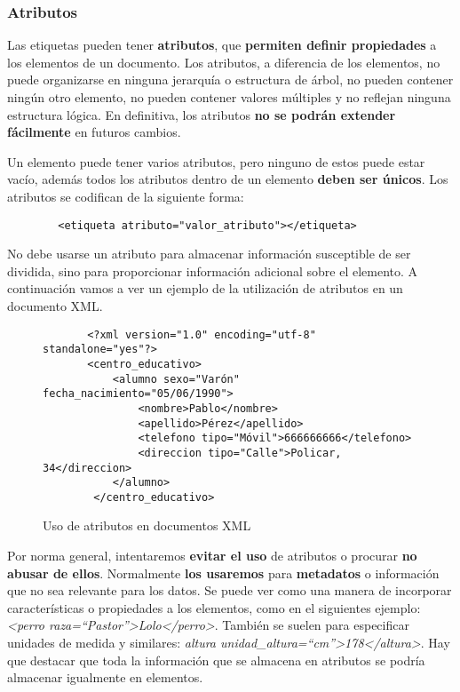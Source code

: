 \subsubsection{Atributos}
Las etiquetas pueden tener \textbf{atributos}, que \textbf{permiten definir propiedades} a los elementos de un documento. Los atributos, a diferencia de los elementos, no puede organizarse en ninguna jerarquía	o estructura de árbol, no pueden contener ningún otro elemento, no pueden contener valores múltiples y no reflejan ninguna estructura lógica. En definitiva, los atributos \textbf{no se podrán extender fácilmente} en futuros cambios.

Un elemento puede tener varios atributos, pero ninguno de estos puede estar vacío, además todos los atributos dentro de un elemento \textbf{deben ser únicos}. Los atributos se codifican de la siguiente forma:

\begin{tcolorbox}[sharp corners, colback=yellow!40, colframe=white!20]
    \begin{verbatim}        <etiqueta atributo="valor_atributo"></etiqueta>\end{verbatim}
\end{tcolorbox}

No debe usarse un atributo para almacenar información susceptible de ser dividida, sino para proporcionar información adicional sobre el elemento. A continuación vamos a ver un ejemplo de la utilización de atributos en un documento XML.

\begin{figure}[h]
    \begin{tcolorbox}[sharp corners, colback=yellow!30, colframe=white!20]
        \scriptsize
        \begin{verbatim}
       <?xml version="1.0" encoding="utf-8" standalone="yes"?>
       <centro_educativo>
           <alumno sexo="Varón" fecha_nacimiento="05/06/1990">
               <nombre>Pablo</nombre>
               <apellido>Pérez</apellido>
               <telefono tipo="Móvil">666666666</telefono>
               <direccion tipo="Calle">Policar, 34</direccion>
           </alumno>
        </centro_educativo>
        \end{verbatim}
    \end{tcolorbox}
    \caption{Uso de atributos en documentos XML}
\end{figure}

Por norma general, intentaremos \textbf{evitar el uso} de atributos o procurar \textbf{no abusar de ellos}. Normalmente \textbf{los usaremos} para \textbf{metadatos} o información que no sea relevante para los datos. Se puede ver como una manera de incorporar características o propiedades a los elementos, como en el siguientes ejemplo: \textit{<perro raza=``Pastor''>Lolo</perro>}. También se suelen para especificar unidades de medida y similares: \textit{altura unidad\_altura=``cm''>178</altura>}. Hay que destacar que toda la información que se almacena en atributos se podría almacenar igualmente en elementos.

